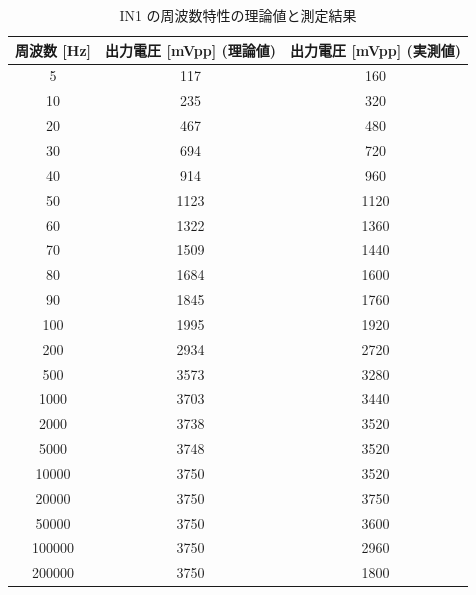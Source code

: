 \documentclass{jlreq}
\numberwithin{equation}{section}
\begin{document}
\begin{table}[H]
  \centering
  \caption{IN1 の周波数特性の理論値と測定結果}
  \begin{tabular}{|c|c|c|}
    \hline
    周波数 [Hz] & 出力電圧 [mVpp] (理論値) & 出力電圧 [mVpp] (実測値) \\ \hline
    5 & 117 & 160 \\ \hline
    10 & 235 & 320 \\ \hline
    20 & 467 & 480 \\ \hline
    30 & 694 & 720 \\ \hline
    40 & 914 & 960 \\ \hline
    50 & 1123 & 1120 \\ \hline
    60 & 1322 & 1360 \\ \hline
    70 & 1509 & 1440 \\ \hline
    80 & 1684 & 1600 \\ \hline
    90 & 1845 & 1760 \\ \hline
    100 & 1995 & 1920 \\ \hline
    200 & 2934 & 2720 \\ \hline
    500 & 3573 & 3280 \\ \hline
    1000 & 3703 & 3440 \\ \hline
    2000 & 3738 & 3520 \\ \hline
    5000 & 3748 & 3520 \\ \hline
    10000 & 3750 & 3520 \\ \hline
    20000 & 3750 & 3750 \\ \hline
    50000 & 3750 & 3600 \\ \hline
    100000 & 3750 & 2960 \\ \hline
    200000 & 3750 & 1800 \\ \hline
  \end{tabular}
\end{table}
\end{document}
